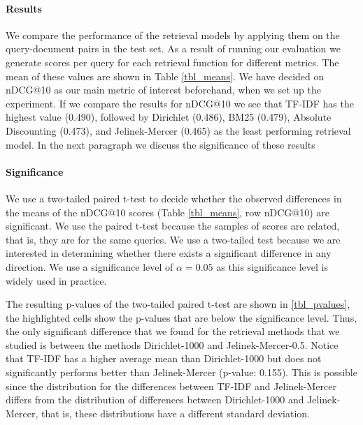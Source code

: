 

\paragraph{Results}

We compare the performance of the retrieval models by applying them on the query-document pairs in the test set. 
As a result of running our evaluation we generate scores per query for each retrieval function
for different metrics. The mean of these values are shown in Table \ref{tbl_means}. 
We have decided on nDCG@10 as our main metric of interest beforehand, when we set up the experiment. If we compare the results for nDCG@10 we see that TF-IDF has the highest
value (0.490), followed by Dirichlet (0.486), BM25 (0.479), Absolute Discounting (0.473),
and Jelinek-Mercer (0.465) as the least performing retrieval model.
In the next paragraph we discuss the significance 
of these results



\paragraph{Significance}

We use a two-tailed paired t-test to decide whether the observed differences in the means of the nDCG@10 scores (Table \ref{tbl_means}, row nDCG@10) are significant.
We use the paired t-test because the samples of scores are related,
that is, they are for the same queries.
We use a two-tailed test because we are interested in determining
whether there exists a significant difference in any direction.
We use a significance level of $\alpha = 0.05$ as this significance level is widely used in practice.



The resulting p-values of the two-tailed paired t-test are shown in \ref{tbl_pvalues}, the highlighted cells show the p-values that are below the significance level. Thus, the only significant difference that we found for the retrieval methods that we studied is between the methods Dirichlet-1000 and Jelinek-Mercer-0.5.
Notice that TF-IDF has a higher average mean than Dirichlet-1000 but 
does not significantly performs better than Jelinek-Mercer (p-value: 0.155).
This is possible since the distribution for the differences between TF-IDF 
and Jelinek-Mercer differs from the distribution of differences between
Dirichlet-1000 and Jelinek-Mercer, that is, these distributions have a different 
standard deviation.

